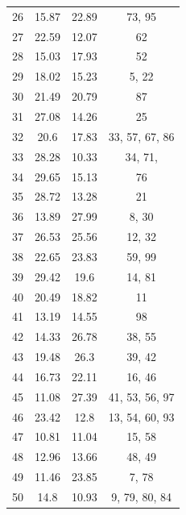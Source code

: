 \documentclass[12pt]{article}
\begin{document}
\begin{table}[h]
\begin{minipage}{.49\linewidth}
\begin{tabular}{c|ccc|}
    \hline
26 & 15.87 & 22.89 &   73, 95  \\
27 & 22.59 & 12.07 &   62     \\
28 & 15.03 & 17.93 &   52     \\
29 & 18.02 & 15.23 &    5, 22  \\
30 & 21.49 & 20.79 &   87     \\
31 & 27.08 & 14.26 &   25     \\
32 & 20.6 & 17.83 &   33, 57, 67, 86  \\
33 & 28.28 & 10.33 &   34, 71,  \\
34 & 29.65 & 15.13 &   76     \\
35 & 28.72 & 13.28 &   21     \\
36 & 13.89 & 27.99 &    8, 30  \\
37 & 26.53 & 25.56 &   12, 32  \\
38 & 22.65 & 23.83 &   59, 99  \\
39 & 29.42 & 19.6 &   14, 81  \\
40 & 20.49 & 18.82 &   11     \\
41 & 13.19 & 14.55 &   98     \\
42 & 14.33 & 26.78 &   38, 55  \\
43 & 19.48 & 26.3 &   39, 42  \\
44 & 16.73 & 22.11 &   16, 46  \\
45 & 11.08 & 27.39 &   41, 53, 56,  97  \\
46 & 23.42 & 12.8 &   13, 54, 60,  93  \\
47 & 10.81 & 11.04 &   15, 58  \\
48 & 12.96 & 13.66 &   48, 49  \\
49 & 11.46 & 23.85 &    7, 78  \\
50 & 14.8 & 10.93 &    9, 79, 80,  84  \\
    \hline
    \end{tabular}
    \end{minipage}
\end{table}
\FloatBarrier
\end{document}
